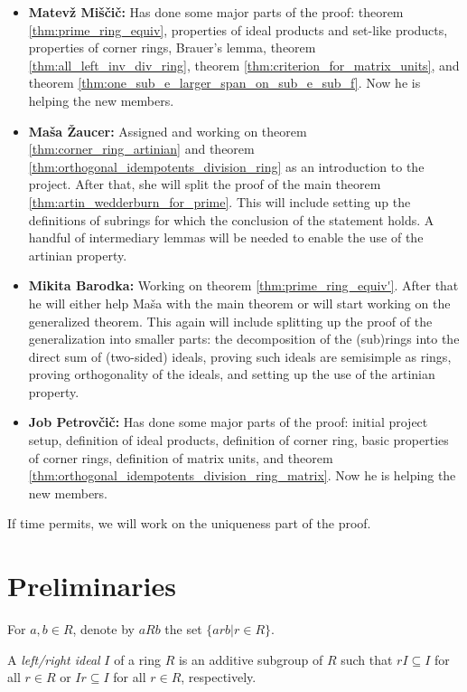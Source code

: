 \begin{itemize}
  \item \textbf{Matevž Miščič: } Has done some major parts of the proof: theorem \ref{thm:prime_ring_equiv}, properties of ideal products and set-like products, properties of corner rings, Brauer's lemma, theorem \ref{thm:all_left_inv_div_ring}, theorem \ref{thm:criterion_for_matrix_units}, and theorem \ref{thm:one_sub_e_larger_span_on_sub_e_sub_f}. Now he is helping the new members.
  \item \textbf{Maša Žaucer: } Assigned and working on theorem \ref{thm:corner_ring_artinian} and theorem \ref{thm:orthogonal_idempotents_division_ring} as an introduction to the project. After that, she will split the proof of the main theorem \ref{thm:artin_wedderburn_for_prime}. This will include setting up the definitions of subrings for which the conclusion of the statement holds. A handful of intermediary lemmas will be needed to enable the use of the artinian property.
  \item \textbf{Mikita Barodka: } Working on theorem \ref{thm:prime_ring_equiv'}. After that he will either help Maša with the main theorem or will start working on the generalized theorem. This again will include splitting up the proof of the generalization into smaller parts: the decomposition of the (sub)rings into the direct sum of (two-sided) ideals, proving such ideals are semisimple as rings, proving orthogonality of the ideals, and setting up the use of the artinian property.
  \item \textbf{Job Petrovčič: } Has done some major parts of the proof: initial project setup, definition of ideal products, definition of corner ring, basic properties of corner rings, definition of matrix units, and theorem \ref{thm:orthogonal_idempotents_division_ring_matrix}. Now he is helping the new members.
\end{itemize}
If time permits, we will work on the uniqueness part of the proof.

\section{Preliminaries}
  \begin{definition}
      \leanok
      For $a, b \in R$, denote by $aRb$ the set $\{arb| r \in R\}$.
  \end{definition}

  \begin{definition}
    A \textit{left/right ideal} $I$ of a ring $R$ is an additive subgroup of $R$ such that $rI \subseteq I$ for all $r \in R$ or $Ir \subseteq I$ for all $r \in R$, respectively.
  \end{definition}

